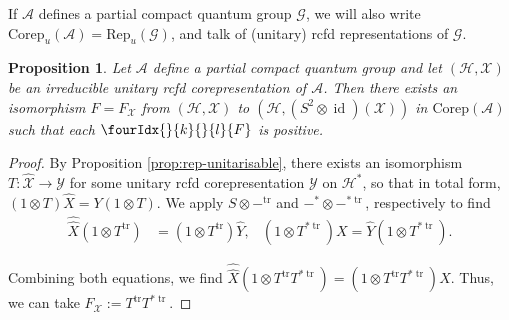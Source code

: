 \documentclass[10pt]{article}
\DeclareMathOperator{\id}{id}
\DeclareMathOperator{\tr}{\mathrm{tr}}
\newcommand{\dual}[1]{#1^{*}}
\newcommand{\dualop}[1]{#1^{\tr}}
\newcommand{\dualco}[1]{\hat{#1}}
\newcommand{\Corep}{\mathrm{Corep}}
\newcommand{\Hsp}{\mathcal{H}}
\newcommand{\Rep}{\mathrm{Rep}}
\newcommand{\Gr}[5]{\fourIdx{#2}{#4}{#3}{#5}{#1}}%
\newcommand{\Gru}[3]{\Gr{#1}{}{}{#2}{#3}}
\newtheorem{Prop}[Theorem]{Proposition}
\theoremstyle{definition}
\numberwithin{equation}{section}
\begin{document}
If $\mathscr{A}$ defines a partial compact quantum group $\mathscr{G}$, we will also write $\Corep_u(\mathscr{A})= \Rep_u(\mathscr{G})$, and talk of (unitary) rcfd representations of $\mathscr{G}$.  
   

\begin{Prop} \label{prop:rep-unitary-bidual}
  Let $\mathscr{A}$ define a partial compact quantum group and let
  $(\Hsp,\mathscr{X})$ be an irreducible unitary rcfd corepresentation of
  $\mathscr{A}$.  Then there exists an isomorphism $F=F_{\mathscr{X}}$
  from $(\Hsp,\mathscr{X})$ to 
  $(\Hsp,(S^{2} \otimes \id)(\mathscr{X}))$ in $\Corep(\mathscr{A})$ such
  that each $\Gru{F}{k}{l}$ is positive.
\end{Prop}
\begin{proof}
 By Proposition \ref{prop:rep-unitarisable}, there exists an
  isomorphism $T \colon \dualco{\mathscr{X}} \to \mathscr{Y}$ for some
  unitary rcfd corepresentation $\mathscr{Y}$ on $\dual{\Hsp}$, so that in total form,
  $(1\otimes T)\dualco{X} = Y(1 \otimes T)$.
We  apply   $S \otimes -^{\tr}$ and $-^{*} \otimes -^{*\tr}$,
respectively to find 
\begin{align*}
 \dualco{\dualco{X}}(1 \otimes \dualop{T}) &= (1 \otimes
  \dualop{T})\dualco{Y}, & (1 \otimes T^{*\tr})X=\dualco{Y}(1\otimes T^{*\tr}).
\end{align*}

Combining both equations, we
find $\dualco{\dualco{X}}(1 \otimes \dualop{T}T^{*\tr})=(1 \otimes
\dualop{T}T^{*\tr})X$. Thus, we can take
$F_{\mathscr{X}}:=\dualop{T}T^{*\tr}$.
\end{proof}
\end{document}

